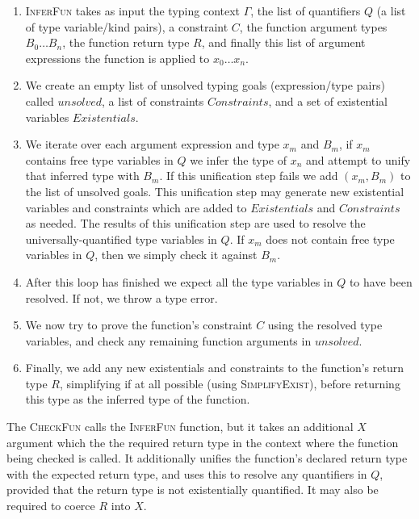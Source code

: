 \begin{enumerate}
\item \textsc{InferFun} takes as input the typing context $\Gamma$, the
  list of quantifiers $Q$ (a list of type variable/kind pairs), a
  constraint $C$, the function argument types $B_0\ldots B_n$, the
  function return type $R$, and finally this list of argument
  expressions the function is applied to $x_0\ldots x_n$.

\item We create an empty list of unsolved typing goals
  (expression/type pairs) called $\mathit{unsolved}$, a list of
  constraints $\mathit{Constraints}$, and a set of existential
  variables $\mathit{Existentials}$.

\item We iterate over each argument expression and type $x_m$ and
  $B_m$, if $x_m$ contains free type variables in $Q$ we infer the
  type of $x_n$ and attempt to unify that inferred type with $B_m$. If
  this unification step fails we add $(x_m, B_m)$ to the list of
  unsolved goals. This unification step may generate new existential
  variables and constraints which are added to $\mathit{Existentials}$
  and $\mathit{Constraints}$ as needed. The results of this
  unification step are used to resolve the universally-quantified type
  variables in $Q$. If $x_m$ does not contain free type variables in
  $Q$, then we simply check it against $B_m$.

\item After this loop has finished we expect all the type variables in
  $Q$ to have been resolved. If not, we throw a type error.

\item We now try to prove the function's constraint $C$ using the
  resolved type variables, and check any remaining function arguments
  in $\mathit{unsolved}$.

\item Finally, we add any new existentials and constraints to the
  function's return type $R$, simplifying if at all possible (using
  \textsc{SimplifyExist}), before returning this type as the inferred
  type of the function.
\end{enumerate}

\noindent The \textsc{CheckFun} calls the \textsc{InferFun} function, but it
takes an additional $X$ argument which the the required return type in
the context where the function being checked is called. It
additionally unifies the function's declared return type with the
expected return type, and uses this to resolve any quantifiers in $Q$,
provided that the return type is not existentially quantified. It may
also be required to coerce $R$ into $X$.

